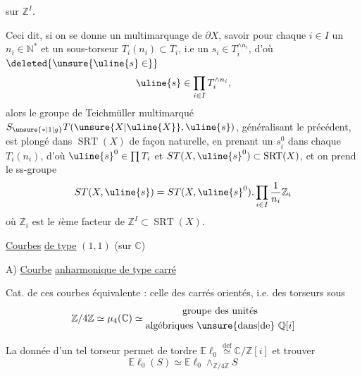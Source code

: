 
 sur $\mathbb Z^I$.



Ceci dit, si on se donne un
multimarquage de $\partial X$, savoir pour
chaque $i\in I$ un $n_i\in\mathbb N^*$ et un
sous-torseur
$T_i(n_i)\subset T_i$,
 i.e
un $s_i\in T_i^{\wedge n_i}$, d'où
$\deleted{\unsure{\uline{s}\in}}$
\[
\uline{s}\in\prod_{i\in I}T_i^{\wedge n_i},
\]
alors le groupe de Teichmüller multimarqué
$S_{\unsure{*|1|g}}T(\unsure{X|\uline{X}},\uline{s})$,
généralisant le précédent, est
plongé dans $\operatorname{SRT}(X)$ de façon naturelle,
en prenant un $s_i^0$ dans chaque $T_i(n_i)$, d'où
$\uline{s}^0\in\prod T_i$ et
$ST(X,\uline{s}^0)\subset\operatorname{SRT}(X)$,
et on prend le ss-groupe
\[
ST(X,\uline{s})=ST(X,\uline{s}^0).
\prod_{i\in I}\frac1{n_i}\mathbb Z_i
\]
où $\mathbb Z_i$ est le $i$ème facteur de
$\mathbb Z^I\subset\operatorname{SRT}(X)$.



\uline{Courbes}  \uline{de type} $(1,1)$ (sur $\mathbb C$)

A) \uline{Courbe}  \uline{anharmonique de type carré}

Cat. de ces courbes équivalente : celle des carrés
 orientés, i.e. des torseurs sous
\[
\mathbb Z/4\mathbb Z\simeq\mu_4(\mathbb C)\simeq
\begin{gathered}
\text{groupe des unités}\\
\text{algébriques \unsure{dans|de} }\mathbb Q[i]
\end{gathered}
\]

La donnée d'un tel torseur  permet de tordre
$\mathbb E\ell_0\overset{\mathrm{def}}\simeq\mathbb C/\mathbb Z[i]$
et trouver
\[
\mathbb E\ell_0(S)\simeq\mathbb E\ell_0
\mathbin{\wedge}_{\mathbb Z/4\mathbb Z}S
\]

